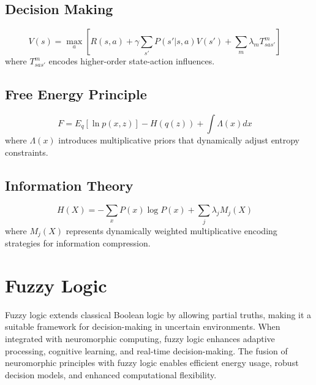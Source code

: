 \documentclass{article}
\theoremstyle{plain}
\begin{document}
\subsection{Decision Making}
\begin{equation}
    V(s) = \max_a \left[ R(s, a) + \gamma \sum_{s'} P(s'|s, a)V(s') 
    + \sum_{m} \lambda_m T_{s a s'}^m \right] 
    \quad 
\end{equation}
where $T_{s a s'}^m$ encodes higher-order state-action influences.

\subsection{Free Energy Principle}
\begin{equation}
    F = E_q[\ln p(x, z)] - H(q(z)) + \int \Lambda(x) dx 
    \quad 
\end{equation}
where $\Lambda(x)$ introduces multiplicative priors that dynamically adjust entropy constraints.

\subsection{Information Theory}
\begin{equation}
    H(X) = -\sum_{x} P(x)\log P(x) + \sum_{j} \lambda_j M_j(X) 
    \quad 
\end{equation}
where $M_j(X)$ represents dynamically weighted multiplicative encoding strategies for information compression.

\section{Fuzzy Logic}

Fuzzy logic extends classical Boolean logic by allowing partial truths, making it a suitable framework for decision-making in uncertain environments. When integrated with neuromorphic computing, fuzzy logic enhances adaptive processing, cognitive learning, and real-time decision-making. The fusion of neuromorphic principles with fuzzy logic enables efficient energy usage, robust decision models, and enhanced computational flexibility.
\end{document}

